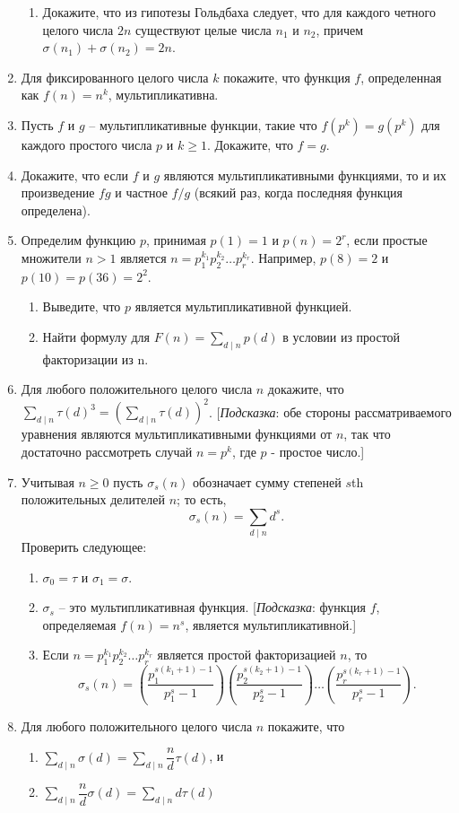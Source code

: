 \documentclass[11pt]{article}
\begin{document}
\begin{enumerate}
\begin{enumerate}
			\item Докажите, что из гипотезы Гольдбаха следует, что для каждого четного целого числа $2n$ существуют целые числа $n_{1}$ и $n_{2}$, причем $\sigma (n_{1}) + \sigma (n_{2}) = 2n $.
		\end{enumerate}
		\item Для фиксированного целого числа $k$ покажите, что функция $f$, определенная как
		$f(n)=n^{k}$, мультипликативна.
		\item Пусть $f$ и $g$ -- мультипликативные функции, такие что $f(p^{k})=g(p^{k}) $ для каждого простого числа $p$ и $k\ge 1.$ Докажите, что $f = g$.
		\item Докажите, что если $f$ и $g$ являются мультипликативными функциями, то и их произведение $fg$ и частное $f/g$ (всякий раз, когда последняя функция определена).
		\item Определим функцию $p$, принимая $p(1)=1$ и $p(n)=2^{r}$, если простые множители $n > 1$ является $n = p_{1}^{k_{1}}p_{2}^{k_{2}}\ldots p_{r}^{k_{r}}$. Например, $p(8) = 2$ и $p(10) = p(36) = 2^{2}$.
		\begin{enumerate} 
			\item Выведите, что $p$ является мультипликативной функцией.
			\item Найти формулу для $F(n) = \sum_{d\mid n}p(d)$ в условии из простой факторизации из n.
		\end{enumerate}
		\item Для любого положительного целого числа $n$ докажите, что $\sum_{d\mid n} \tau(d)^{3} = \left(\sum_{d\mid n}\tau(d)\right)^{2}$. [{\itshape Подсказка}: обе стороны рассматриваемого уравнения являются мультипликативными функциями от $n$, так что достаточно рассмотреть случай $n=p^{k}$, где $p$ - простое число.]
		\item Учитывая $n\ge 0$ пусть $\sigma_{s}(n)$ обозначает сумму степеней $s$th положительных делителей $n$; то есть, \[\sigma_{s}(n)=\sum_{d\mid n}d^{s}.\]
		Проверить следующее:
		\begin{enumerate} 
			\item $\sigma_{0} = \tau$ и $\sigma_{1}=\sigma$.
			\item $\sigma_{s}$ -- это мультипликативная функция. [{\itshape Подсказка}: функция $f$, определяемая $f(n)=n^{s}$, является мультипликативной.]
			\item Если $n = p_{1}^{k_{1}}p_{2}^{k_{2}}\ldots p_{r}^{k_{r}}$ является простой факторизацией $n$, то \[\sigma_{s}(n)=\left(\frac{p_{1}^{s(k_{1}+1)-1}}{p_{1}^{s}-1}\right)\left(\frac{p_{2}^{s(k_{2}+1)-1}}{p_{2}^{s}-1}\right)\ldots \left(\frac{p_{r}^{s(k_{r}+1)-1}}{p_{r}^{s}-1}\right).\]
		\end{enumerate}
		\item Для любого положительного целого числа $n$ покажите, что
		\begin{enumerate} 
			\item $\sum \limits_{d\mid n}\sigma(d)=\sum \limits_{d\mid n}\dfrac{n}{d}\tau(d)$, и
			\setlength{\parskip}{2mm}
			\item $\sum \limits_{d\mid n}\dfrac{n}{d}\sigma(d)= \sum \limits_{d\mid n}d\tau(d)$
			

\end{enumerate}
\end{enumerate}
\end{document}
